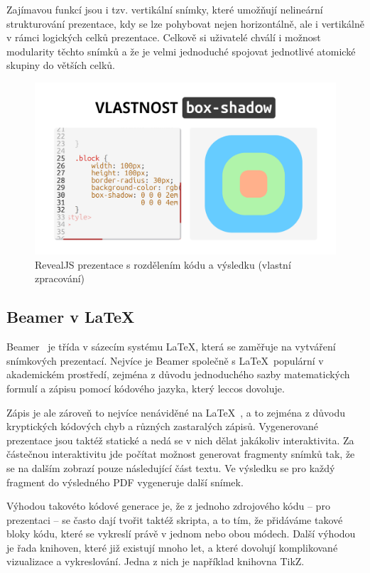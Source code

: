 Zajímavou funkcí jsou i tzv. vertikální snímky, které umožňují nelineární strukturování prezentace, kdy se lze pohybovat nejen horizontálně, ale i vertikálně v rámci logických celků prezentace.
Celkově si uživatelé chválí i možnost modularity těchto snímků a že je velmi jednoduché spojovat jednotlivé atomické skupiny do větších celků.


\begin{figure}[ht!]
    \centering
    \includegraphics[width=0.9\linewidth]{media/03_analyza/revealjs.png}
    \caption[RevealJS prezentace s rozdělením kódu a výsledku]{RevealJS prezentace s rozdělením kódu a výsledku (vlastní zpracování)}\label{fig:analyza:revealjs-ukazka}
\end{figure}

\subsection{Beamer v \LaTeX}

Beamer~\cite{beamer} je třída v sázecím systému \LaTeX, která se zaměřuje na vytváření snímkových prezentací.
Nejvíce je Beamer společně s \LaTeX~populární v akademickém prostředí, zejména z důvodu jednoduchého sazby matematických formulí a zápisu pomocí kódového jazyka, který leccos dovoluje. 

Zápis je ale zároveň to nejvíce nenáviděné na \LaTeX~\cite{latex_reddit}, a to zejména z důvodu kryptických kódových chyb a různých zastaralých zápisů.
Vygenerované prezentace jsou taktéž statické a nedá se v nich dělat jakákoliv interaktivita. 
Za částečnou interaktivitu jde počítat možnost generovat fragmenty snímků tak, že se na dalším zobrazí pouze následující část textu.
Ve výsledku se pro každý fragment do výsledného PDF vygeneruje další snímek.

Výhodou takovéto kódové generace je, že z jednoho zdrojového kódu -- pro prezentaci -- se často dají tvořit taktéž skripta, a to tím, že přidáváme takové bloky kódu, které se vykreslí právě v jednom nebo obou módech.
Další výhodou je řada knihoven, které již existují mnoho let, a které dovolují komplikované vizualizace a vykreslování.
Jedna z nich je například knihovna TikZ. 

